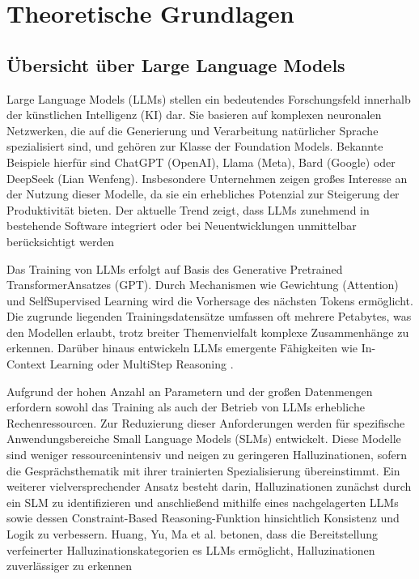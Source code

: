 \section{Theoretische Grundlagen}

\subsection{Übersicht über Large Language Models}

Large Language Models (LLMs) stellen ein bedeutendes Forschungsfeld innerhalb
der künstlichen Intelligenz (KI) dar. Sie basieren auf komplexen neuronalen
Netzwerken, die auf die Generierung und Verarbeitung natürlicher Sprache
spezialisiert sind, und gehören zur Klasse der Foundation Models. Bekannte
Beispiele hierfür sind ChatGPT (OpenAI), Llama (Meta), Bard (Google) oder
DeepSeek (Lian Wenfeng). Insbesondere Unternehmen zeigen großes Interesse an
der Nutzung dieser Modelle, da sie ein erhebliches Potenzial zur Steigerung
der Produktivität bieten. Der aktuelle Trend zeigt, dass LLMs zunehmend in
bestehende Software integriert oder bei Neuentwicklungen unmittelbar
berücksichtigt werden \autocites[Vgl.][S. 1-2,5]{lu2024taxonomy}[S. 1-2]{minaee2024survey}

Das Training von LLMs erfolgt auf Basis des Generative Pretrained
TransformerAnsatzes (GPT). Durch Mechanismen wie Gewichtung (Attention) und
SelfSupervised Learning wird die Vorhersage des nächsten Tokens ermöglicht.
Die zugrunde liegenden Trainingsdatensätze umfassen oft mehrere Petabytes, was
den Modellen erlaubt, trotz breiter Themenvielfalt komplexe Zusammenhänge zu
erkennen. Darüber hinaus entwickeln LLMs emergente Fähigkeiten wie In-Context
Learning oder MultiStep Reasoning \autocites[Vgl.][S. 6-10]{lu2024taxonomy}{lu2024taxonomy}[S. 1-2]{minaee2024survey}[S. 1-2]{naveed2024overview}.

Aufgrund der hohen Anzahl an Parametern und der großen Datenmengen erfordern
sowohl das Training als auch der Betrieb von LLMs erhebliche Rechenressourcen.
Zur Reduzierung dieser Anforderungen werden für spezifische Anwendungsbereiche
Small Language Models (SLMs) entwickelt. Diese Modelle sind weniger
ressourcenintensiv und neigen zu geringeren Halluzinationen, sofern die
Gesprächsthematik mit ihrer trainierten Spezialisierung übereinstimmt. Ein
weiterer vielversprechender Ansatz besteht darin, Halluzinationen zunächst
durch ein SLM zu identifizieren und anschließend mithilfe eines nachgelagerten
LLMs sowie dessen Constraint-Based Reasoning-Funktion hinsichtlich Konsistenz
und Logik zu verbessern. Huang, Yu, Ma et al. betonen, dass die Bereitstellung
verfeinerter Halluzinationskategorien es LLMs ermöglicht, Halluzinationen
zuverlässiger zu erkennen \autocites[Vlg.][]{kelbert2023llm}{huang2024hallucination}[S. 6-14]{hu2024slm}

